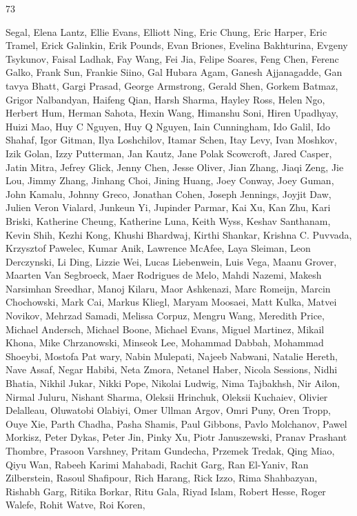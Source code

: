 \documentclass[
  10
]{article}
\begin{document}
73

Segal, Elena Lantz, Ellie Evans, Elliott Ning, Eric Chung, Eric Harper,
Eric Tramel, Erick Galinkin, Erik Pounds, Evan Briones, Evelina
Bakhturina, Evgeny Tsykunov, Faisal Ladhak, Fay Wang, Fei Jia, Felipe
Soares, Feng Chen, Ferenc Galko, Frank Sun, Frankie Siino, Gal Hubara
Agam, Ganesh Ajjanagadde, Gan tavya Bhatt, Gargi Prasad, George
Armstrong, Gerald Shen, Gorkem Batmaz, Grigor Nalbandyan, Haifeng Qian,
Harsh Sharma, Hayley Ross, Helen Ngo, Herbert Hum, Herman Sahota, Hexin
Wang, Himanshu Soni, Hiren Upadhyay, Huizi Mao, Huy C Nguyen, Huy Q
Nguyen, Iain Cunningham, Ido Galil, Ido Shahaf, Igor Gitman, Ilya
Loshchilov, Itamar Schen, Itay Levy, Ivan Moshkov, Izik Golan, Izzy
Putterman, Jan Kautz, Jane Polak Scowcroft, Jared Casper, Jatin Mitra,
Jefrey Glick, Jenny Chen, Jesse Oliver, Jian Zhang, Jiaqi Zeng, Jie Lou,
Jimmy Zhang, Jinhang Choi, Jining Huang, Joey Conway, Joey Guman, John
Kamalu, Johnny Greco, Jonathan Cohen, Joseph Jennings, Joyjit Daw,
Julien Veron Vialard, Junkeun Yi, Jupinder Parmar, Kai Xu, Kan Zhu, Kari
Briski, Katherine Cheung, Katherine Luna, Keith Wyss, Keshav Santhanam,
Kevin Shih, Kezhi Kong, Khushi Bhardwaj, Kirthi Shankar, Krishna C.
Puvvada, Krzysztof Pawelec, Kumar Anik, Lawrence McAfee, Laya Sleiman,
Leon Derczynski, Li Ding, Lizzie Wei, Lucas Liebenwein, Luis Vega, Maanu
Grover, Maarten Van Segbroeck, Maer Rodrigues de Melo, Mahdi Nazemi,
Makesh Narsimhan Sreedhar, Manoj Kilaru, Maor Ashkenazi, Marc Romeijn,
Marcin Chochowski, Mark Cai, Markus Kliegl, Maryam Moosaei, Matt Kulka,
Matvei Novikov, Mehrzad Samadi, Melissa Corpuz, Mengru Wang, Meredith
Price, Michael Andersch, Michael Boone, Michael Evans, Miguel Martinez,
Mikail Khona, Mike Chrzanowski, Minseok Lee, Mohammad Dabbah, Mohammad
Shoeybi, Mostofa Pat wary, Nabin Mulepati, Najeeb Nabwani, Natalie
Hereth, Nave Assaf, Negar Habibi, Neta Zmora, Netanel Haber, Nicola
Sessions, Nidhi Bhatia, Nikhil Jukar, Nikki Pope, Nikolai Ludwig, Nima
Tajbakhsh, Nir Ailon, Nirmal Juluru, Nishant Sharma, Oleksii Hrinchuk,
Oleksii Kuchaiev, Olivier Delalleau, Oluwatobi Olabiyi, Omer Ullman
Argov, Omri Puny, Oren Tropp, Ouye Xie, Parth Chadha, Pasha Shamis, Paul
Gibbons, Pavlo Molchanov, Pawel Morkisz, Peter Dykas, Peter Jin, Pinky
Xu, Piotr Januszewski, Pranav Prashant Thombre, Prasoon Varshney, Pritam
Gundecha, Przemek Tredak, Qing Miao, Qiyu Wan, Rabeeh Karimi Mahabadi,
Rachit Garg, Ran El-Yaniv, Ran Zilberstein, Rasoul Shafipour, Rich
Harang, Rick Izzo, Rima Shahbazyan, Rishabh Garg, Ritika Borkar, Ritu
Gala, Riyad Islam, Robert Hesse, Roger Walefe, Rohit Watve, Roi Koren,
\end{document}
